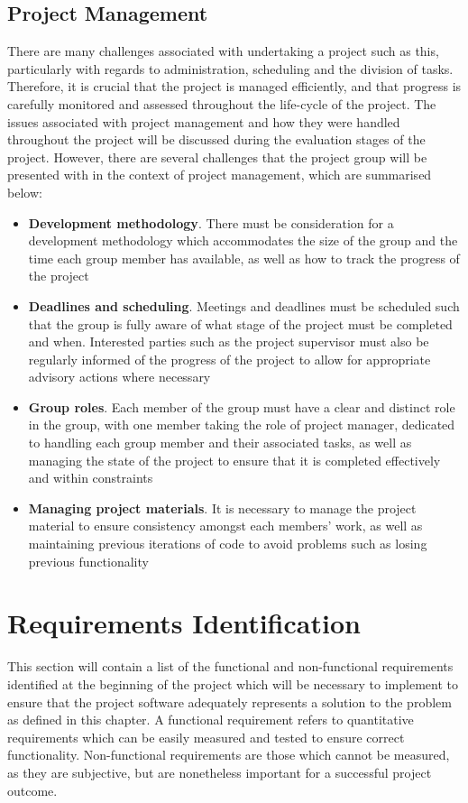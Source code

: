 		\subsection{Project Management}
		There are many challenges associated with undertaking a project such as this, particularly with regards to administration, scheduling and the division of tasks. Therefore, it is crucial that the project is managed efficiently, and that progress is carefully monitored and assessed throughout the life-cycle of the project. The issues associated with project management and how they were handled throughout the project will be discussed during the evaluation stages of the project. However, there are several challenges that the project group will be presented with in the context of project management, which are summarised below:
\begin{itemize}
\item \textbf{Development methodology}. There must be consideration for a development methodology which accommodates the size of the group and the time each group member has available, as well as how to track the progress of the project
\item \textbf{Deadlines and scheduling}. Meetings and deadlines must be scheduled such that the group is fully aware of what stage of the project must be completed and when. Interested parties such as the project supervisor must also be regularly informed of the progress of the project to allow for appropriate advisory actions where necessary
\item \textbf{Group roles}. Each member of the group must have a clear and distinct role in the group, with one member taking the role of project manager, dedicated to handling each group member and their associated tasks, as well as managing the state of the project to ensure that it is completed effectively and within constraints
\item \textbf{Managing project materials}. It is necessary to manage the project material to ensure consistency amongst each members’ work, as well as maintaining previous iterations of code to avoid problems such as losing previous functionality
\end{itemize}
	\section{Requirements Identification}
	This section will contain a list of the functional and non-functional requirements identified at the beginning of the project which will be necessary to implement to ensure that the project software adequately represents a solution to the problem as defined in this chapter. A functional requirement refers to quantitative requirements which can be easily measured and tested to ensure correct functionality. Non-functional requirements are those which cannot be measured, as they are subjective, but are nonetheless important for a successful project outcome. 

